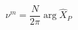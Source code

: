 \begin{equation}
\label{eq:Wannier_center}
    \nu^m = \frac{N}{2\pi} \; \text{arg} \; \hat{X}_P
\end{equation}

 

